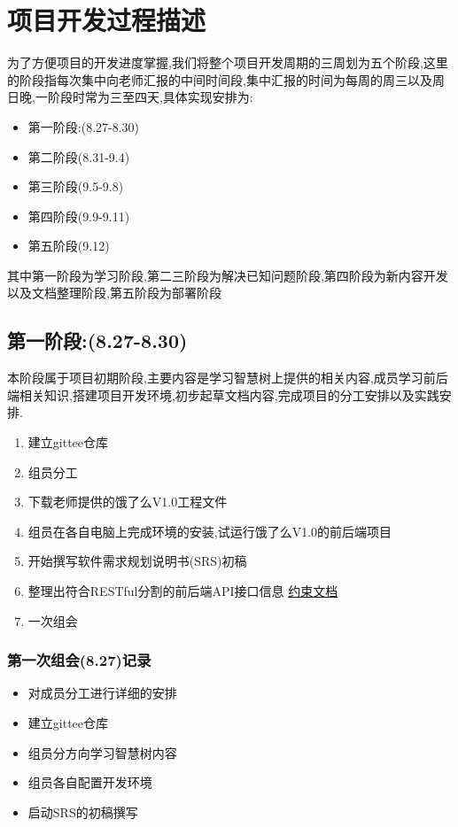 \chapter{项目开发过程描述}

为了方便项目的开发进度掌握,我们将整个项目开发周期的三周划为五个阶段,这里的阶段指每次集中向老师汇报的中间时间段,集中汇报的时间为每周的周三以及周日晚,一阶段时常为三至四天,具体实现安排为:
\begin{itemize}
    \item 第一阶段:(8.27-8.30)
    \item 第二阶段(8.31-9.4)
    \item 第三阶段(9.5-9.8)
    \item 第四阶段(9.9-9.11)
    \item 第五阶段(9.12)
\end{itemize}
其中第一阶段为学习阶段,第二三阶段为解决已知问题阶段,第四阶段为新内容开发以及文档整理阶段,第五阶段为部署阶段
\section{第一阶段:(8.27-8.30)}
本阶段属于项目初期阶段,主要内容是学习智慧树上提供的相关内容,成员学习前后端相关知识,搭建项目开发环境,初步起草文档内容,完成项目的分工安排以及实践安排.
\begin{enumerate}
    \item 建立gittee仓库
    \item 组员分工
    \item 下载老师提供的饿了么V1.0工程文件
    \item 组员在各自电脑上完成环境的安装,试运行饿了么V1.0的前后端项目
    \item 开始撰写软件需求规划说明书(SRS)初稿
    \item 整理出符合RESTful分割的前后端API接口信息 \href{https://www.yuque.com/clearautumn/gse398/ecqwgdmq8ylnntda#F75L}{约束文档}
    \item 一次组会
\end{enumerate}
\subsection{第一次组会(8.27)记录}
\begin{itemize}
    \item 对成员分工进行详细的安排
    \item 建立gittee仓库
    \item 组员分方向学习智慧树内容
    \item 组员各自配置开发环境
    \item 启动SRS的初稿撰写
\end{itemize}

